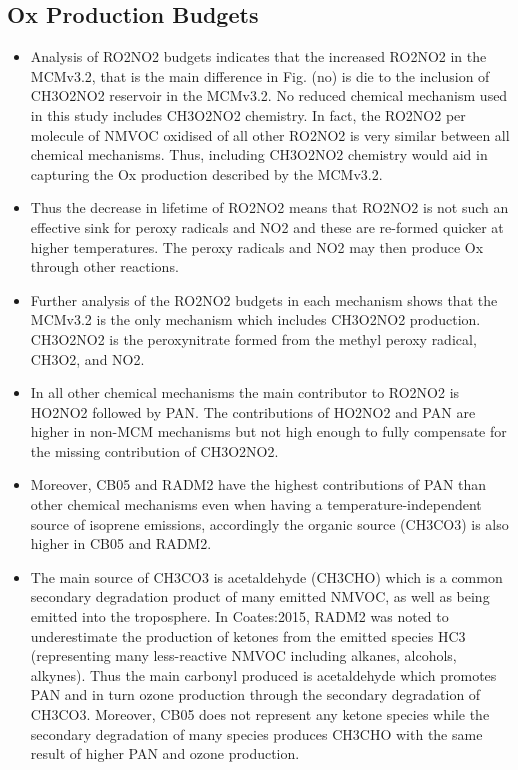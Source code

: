 \documentclass[11pt,a4paper]{article}
\begin{document}
\subsection{Ox Production Budgets}
\begin{itemize}
    \item Analysis of RO2NO2 budgets indicates that the increased RO2NO2 in the MCMv3.2, that is the main difference in Fig. (no) is die to the inclusion of CH3O2NO2 reservoir in the MCMv3.2. No reduced chemical mechanism used in this study includes CH3O2NO2 chemistry. In fact, the RO2NO2 per molecule of NMVOC oxidised of all other RO2NO2 is very similar between all chemical mechanisms. Thus, including CH3O2NO2 chemistry would aid in capturing the Ox production described by the MCMv3.2.
    \item Thus the decrease in lifetime of RO2NO2 means that RO2NO2 is not such an effective sink for peroxy radicals and NO2 and these are re-formed quicker at higher temperatures. The peroxy radicals and NO2 may then produce Ox through other reactions.
    \item Further analysis of the RO2NO2 budgets in each mechanism shows that the MCMv3.2 is the only mechanism which includes CH3O2NO2 production. CH3O2NO2 is the peroxynitrate formed from the methyl peroxy radical, CH3O2, and NO2.  
    \item In all other chemical mechanisms the main contributor to RO2NO2 is HO2NO2 followed by PAN. The contributions of HO2NO2 and PAN are higher in non-MCM mechanisms but not high enough to fully compensate for the missing contribution of CH3O2NO2. 
    \item Moreover, CB05 and RADM2 have the highest contributions of PAN than other chemical mechanisms even when having a temperature-independent source of isoprene emissions, accordingly the organic source (CH3CO3) is also higher in CB05 and RADM2.
    \item The main source of CH3CO3 is acetaldehyde (CH3CHO) which is a common secondary degradation product of many emitted NMVOC, as well as being emitted into the troposphere. In Coates:2015, RADM2 was noted to underestimate the production of ketones from the emitted species HC3 (representing many less-reactive NMVOC including alkanes, alcohols, alkynes). Thus the main carbonyl produced is acetaldehyde which promotes PAN and in turn ozone production through the secondary degradation of CH3CO3. Moreover, CB05 does not represent any ketone species while the secondary degradation of many species produces CH3CHO with the same result of higher PAN and ozone production.
\end{itemize}
\end{document}
